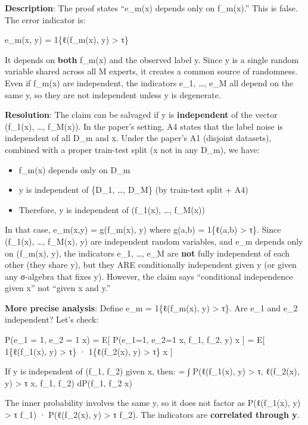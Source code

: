 \documentclass[
  12pt,
]{article}
\providecommand{\tightlist}{%
  \setlength{\itemsep}{0pt}\setlength{\parskip}{0pt}}
\begin{document}
\textbf{Description}: The proof states ``e\_m(x) depends only on
f\_m(x).'' This is false. The error indicator is:

e\_m(x, y) = 1\{ℓ(f\_m(x), y) \textgreater{} τ\}

It depends on \textbf{both} f\_m(x) and the observed label y. Since y is
a single random variable shared across all M experts, it creates a
common source of randomness. Even if f\_m(x) are independent, the
indicators e\_1, \ldots, e\_M all depend on the same y, so they are not
independent unless y is degenerate.

\textbf{Resolution}: The claim can be salvaged if y is
\textbf{independent} of the vector (f\_1(x), \ldots, f\_M(x)). In the
paper's setting, A4 states that the label noise is independent of all
D\_m and x. Under the paper's A1 (disjoint datasets), combined with a
proper train-test split (x not in any D\_m), we have:

\begin{itemize}
\tightlist
\item
  f\_m(x) depends only on D\_m
\item
  y is independent of \{D\_1, \ldots, D\_M\} (by train-test split + A4)
\item
  Therefore, y is independent of (f\_1(x), \ldots, f\_M(x))
\end{itemize}

In that case, e\_m(x,y) = g(f\_m(x), y) where g(a,b) = 1\{ℓ(a,b)
\textgreater{} τ\}. Since (f\_1(x), \ldots, f\_M(x), y) are independent
random variables, and e\_m depends only on (f\_m(x), y), the indicators
e\_1, \ldots, e\_M are \textbf{not} fully independent of each other
(they share y), but they ARE conditionally independent given y (or given
any σ-algebra that fixes y). However, the claim says ``conditional
independence given x'' not ``given x and y.''

\textbf{More precise analysis}: Define e\_m = 1\{ℓ(f\_m(x), y)
\textgreater{} τ\}. Are e\_1 and e\_2 independent? Let's check:

P(e\_1 = 1, e\_2 = 1 \textbar{} x) = E{[} P(e\_1=1, e\_2=1 \textbar{} x,
f\_1, f\_2, y) \textbar{} x {]} = E{[} 1\{ℓ(f\_1(x), y) \textgreater{}
τ\} · 1\{ℓ(f\_2(x), y) \textgreater{} τ\} \textbar{} x {]}

If y is independent of (f\_1, f\_2) given x, then: = ∫ P(ℓ(f\_1(x), y)
\textgreater{} τ, ℓ(f\_2(x), y) \textgreater{} τ \textbar{} x, f\_1,
f\_2) dP(f\_1, f\_2 \textbar{} x)

The inner probability involves the same y, so it does not factor as
P(ℓ(f\_1(x), y) \textgreater{} τ \textbar{} f\_1) · P(ℓ(f\_2(x), y)
\textgreater{} τ \textbar{} f\_2). The indicators are \textbf{correlated
through y}.
\end{document}
